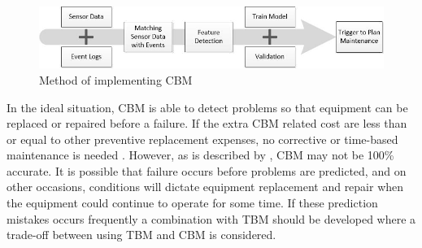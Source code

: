 \begin{figure}[ht]
\centering
\includegraphics[width=\textwidth]{Figures/CBM_Method2}
\caption[Method of implementing CBM]{Method of implementing CBM}
\label{fig:Method CBM}
\end{figure}

In the ideal situation, CBM is able to detect problems so that equipment can be replaced or repaired before a failure. If the extra CBM related cost are less than or equal to other preventive replacement expenses, no corrective or time-based maintenance is needed \parencite{mckone2002,TAKATA2004}. However, as is described by \citet{ALNAJJAR20003}, CBM may not be 100\% accurate. It is possible that failure occurs before problems are predicted, and on other occasions, conditions will dictate equipment replacement and repair when the equipment could continue to operate for some time. If these prediction mistakes occurs frequently a combination with TBM should be developed where a trade-off between using TBM and CBM is considered.

